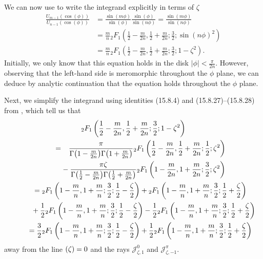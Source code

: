 \documentclass[10pt,a4paper]{amsart}
\let\Re\relax
\DeclareMathOperator{\Re}{Re}
\numberwithin{equation}{section}
\begin{document}
We can now use \cite[identity~(15.4.16)]{dlmf} to write the integrand explicitly in terms of $\zeta$
\begin{align*}
\frac{U_{m-1}(\cos(\phi))}{U_{n-1}(\cos(\phi))} &= \frac{\sin(m\phi)}{\sin(\phi)}\frac{\sin(\phi)}{\sin(n \phi)}= \frac{\sin(m\phi)}{\sin(n \phi)}\\
& = \frac{m}{n} {}_2F_1\left(\frac{1}{2} - \frac{m}{2n}, \frac{1}{2} + \frac{m}{2n}; \frac{3}{2}; \sin(n \phi)^2\right) \\
& = \frac{m}{n} {}_2F_1\left(\frac{1}{2} - \frac{m}{2n}, \frac{1}{2} + \frac{m}{2n}; \frac{3}{2}; 1 - \zeta^2\right).
\end{align*}
Initially, we only know that this equation holds in the disk $|\phi| < \frac{\pi}{2n}$. However, observing that the left-hand side is meromorphic throughout the $\phi$ plane, we can deduce by analytic continuation that the equation holds throughout the $\phi$ plane.

Next, we simplify the integrand using identities (15.8.4) and (15.8.27)--(15.8.28) from \cite{dlmf}, which tell us that
\begin{gather*}
{}_2F_1\left(\frac{1}{2} - \frac{m}{2n}, \frac{1}{2} + \frac{m}{2n}; \frac{3}{2}; 1 - \zeta^2\right) \\
\qquad = \hphantom{+} \frac{\pi}{\Gamma\bigl(1-\frac{m}{2n}\bigr) \Gamma\bigl(1 + \frac{m}{2n}\bigr)} {}_2F_1\left(\frac{1}{2} - \frac{m}{2n}, \frac{1}{2} + \frac{m}{2n}; \frac{1}{2}; \zeta^2\right) \\
\qquad\hphantom{=} - \frac{\pi \zeta}{\Gamma\bigl(\frac{1}{2} - \frac{m}{2n}\bigr) \Gamma\bigl(\frac{1}{2} + \frac{m}{2n}\bigr)} {}_2F_1\left(1 - \frac{m}{2n}, 1 + \frac{m}{2n}; \frac{3}{2}; \zeta^2\right) \\
\qquad = {}_2F_1\left(1 - \frac{m}{n}, 1 + \frac{m}{n}; \frac{3}{2}; \frac{1}{2} - \frac{\zeta}{2}\right) + {}_2F_1\left(1-\frac{m}{n}, 1 + \frac{m}{n}; \frac{3}{2}; \frac{1}{2} + \frac{\zeta}{2}\right) \\
\qquad \hphantom{=} + \frac{1}{2} {}_2F_1\left(1-\frac{m}{n}, 1+\frac{m}{n}; \frac{3}{2}; \frac{1}{2} - \frac{\zeta}{2}\right) - \frac{1}{2} {}_2F_1\left(1-\frac{m}{n}, 1 + \frac{m}{n}; \frac{3}{2}; \frac{1}{2} + \frac{\zeta}{2}\right) \\
\qquad = \frac{3}{2} {}_2F_1\left(1 - \frac{m}{n}, 1 + \frac{m}{n}; \frac{3}{2};\frac{1}{2} - \frac{\zeta}{2}\right) + \frac{1}{2} {}_2F_1\left(1 - \frac{m}{n}, 1 + \frac{m}{n}; \frac{3}{2}; \frac{1}{2} + \frac{\zeta}{2}\right)
\end{gather*}
away from the line $\Re(\zeta) = 0$ and the rays $\mathcal{J}^0_{\zeta,1}$ and $\mathcal{J}^\pi_{\zeta,-1}$.
\end{document}
